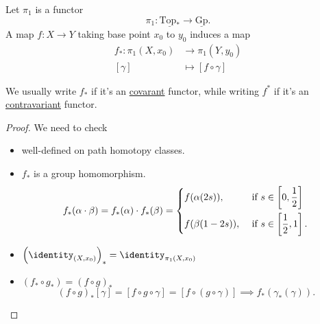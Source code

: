 \begin{theorem}
	Let \(\pi _1\) is a functor
	\[
		\pi _1\colon \underline{\mathrm{Top}_*} \to \underline{\mathrm{Gp}}.
	\]
	A map \(f\colon X\to Y\) taking base point \(x_0\) to \(y_0\) induces a map
	\[
		\begin{split}
			f_*\colon \pi _1(X, x_0)&\to \pi _1(Y, y_0)\\
			[\gamma]&\mapsto [f\circ \gamma]
		\end{split}
	\]
\end{theorem}
\begin{notation}
	We usually write \(f_*\) if it's an \hyperref[def:functor]{covarant} functor, while writing \(f^*\)
	if it's an \hyperref[def:contravariant-functor]{contravariant} functor.
\end{notation}
\begin{proof}
	We need to check
	\begin{itemize}
		\item well-defined on path homotopy classes.
		\item \(f_*\) is a group homomorphism.
		      \[
			      f_*(\alpha \cdot \beta ) = f_*(\alpha )\cdot f_*(\beta ) = \begin{dcases}
				      f(\alpha (2s)),  & \text{ if }  s\in \left[0, \frac{1}{2}\right]  \\
				      f(\beta (1-2s)), & \text{ if }  s\in \left[\frac{1}{2}, 1\right].
			      \end{dcases}
		      \]
		\item \(\left(\identity_{(X, x_0)} \right)_* = \identity_{\pi _1(X, x_0)} \)
		\item \((f_*\circ g_*) = (f\circ g)_*\)
		      \[
			      (f\circ g)_*[\gamma] = [f\circ g\circ \gamma] = [f\circ (g\circ \gamma)]\implies f_*(\gamma_*(\gamma)).
		      \]
	\end{itemize}
\end{proof}

\begin{theorem}\label{thm:Seifert-Van-Kampen-Theorem}

\end{theorem}